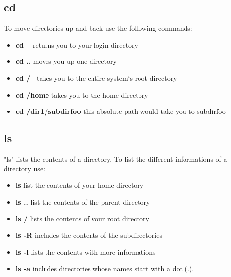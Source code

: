 \documentclass[10pt,a4paper]{scrartcl}
\begin{document}
\begin{description}
\subsection{cd}
To move directories up and back use the following commands:
\begin{doublespacing}
\begin{itemize}
\item{\bf{cd \ }} \qquad  \qquad \qquad returns you to your login directory
\item{\bf{cd ..}} \qquad  \qquad \qquad moves you up one directory
\item{\bf{cd /\ }} \qquad \qquad \qquad takes you to the entire system`s root directory
\item{\bf{cd /home}} \qquad \qquad takes you to the home directory
\item{\bf{cd /dir1/subdirfoo}} \qquad this absolute path would take you to subdirfoo
\end{itemize}
\end{doublespacing}

\subsection{ls}
\begin{singlespacing}
"ls" lists the contents of a directory. To list the different informations of a directory use:
\end{singlespacing}
\begin{doublespacing}
\begin{itemize}
\item{\bf{ls}} \qquad \qquad \qquad list the contents of your home directory
\item{\bf{ls ..}} \qquad \qquad \qquad list the contents of the parent directory
\item{\bf{ls /}} \qquad \qquad \qquad lists the contents of your root directory
\item{\bf{ls -R}} \qquad \qquad \qquad includes the contents of the subdirectories
\item{\bf{ls -l}} \qquad \qquad\qquad lists the contents with more informations
\item{\bf{ls -a}} \qquad \qquad \qquad includes directories whose names start with a dot (.).
\end{itemize}
\end{doublespacing}


\end{description}
\end{document}
